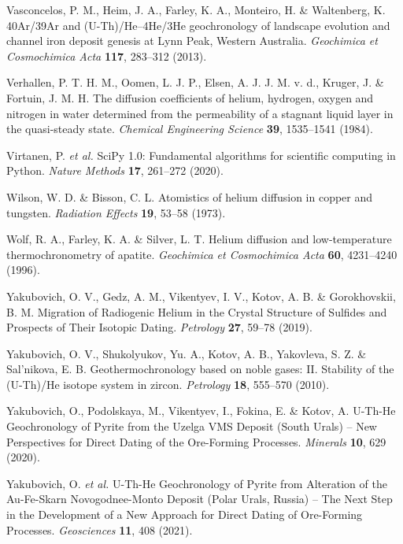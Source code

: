 \documentclass[gchron, manuscript]{copernicus}
\begin{document}
\begin{thebibliography}{}
Vasconcelos, P. M., Heim, J. A., Farley, K. A., Monteiro, H. \& Waltenberg, K. 40Ar/39Ar and (U-Th)/He--4He/3He geochronology of landscape evolution and channel iron deposit genesis at Lynn Peak, Western Australia. \emph{Geochimica et Cosmochimica Acta} \textbf{117}, 283--312 (2013).

Verhallen, P. T. H. M., Oomen, L. J. P., Elsen, A. J. J. M. v. d., Kruger, J. \& Fortuin, J. M. H. The diffusion coefficients of helium, hydrogen, oxygen and nitrogen in water determined from the permeability of a stagnant liquid layer in the quasi-steady state. \emph{Chemical Engineering Science} \textbf{39}, 1535--1541 (1984).

Virtanen, P. \emph{et al.} SciPy 1.0: Fundamental algorithms for scientific computing in Python. \emph{Nature Methods} \textbf{17}, 261--272 (2020).

Wilson, W. D. \& Bisson, C. L. Atomistics of helium diffusion in copper and tungsten. \emph{Radiation Effects} \textbf{19}, 53--58 (1973).

Wolf, R. A., Farley, K. A. \& Silver, L. T. Helium diffusion and low-temperature thermochronometry of apatite. \emph{Geochimica et Cosmochimica Acta} \textbf{60}, 4231--4240 (1996).

Yakubovich, O. V., Gedz, A. M., Vikentyev, I. V., Kotov, A. B. \& Gorokhovskii, B. M. Migration of Radiogenic Helium in the Crystal Structure of Sulfides and Prospects of Their Isotopic Dating. \emph{Petrology} \textbf{27}, 59--78 (2019).

Yakubovich, O. V., Shukolyukov, Yu. A., Kotov, A. B., Yakovleva, S. Z. \& Sal'nikova, E. B. Geothermochronology based on noble gases: II. Stability of the (U-Th)/He isotope system in zircon. \emph{Petrology} \textbf{18}, 555--570 (2010).

Yakubovich, O., Podolskaya, M., Vikentyev, I., Fokina, E. \& Kotov, A. U-Th-He Geochronology of Pyrite from the Uzelga VMS Deposit (South Urals) -- New Perspectives for Direct Dating of the Ore-Forming Processes. \emph{Minerals} \textbf{10}, 629 (2020).

Yakubovich, O. \emph{et al.} U-Th-He Geochronology of Pyrite from Alteration of the Au-Fe-Skarn Novogodnee-Monto Deposit (Polar Urals, Russia) -- The Next Step in the Development of a New Approach for Direct Dating of Ore-Forming Processes. \emph{Geosciences} \textbf{11}, 408 (2021).


\end{thebibliography}
\end{document}
